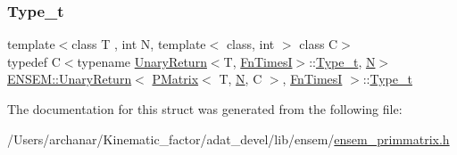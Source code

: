\mbox{\label{structENSEM_1_1UnaryReturn_3_01PMatrix_3_01T_00_01N_00_01C_01_4_00_01FnTimesI_01_4_aab89467172d831a392a305ca7f49772e}} 
\subsubsection{\texorpdfstring{Type\_t}{Type\_t}\hspace{0.1cm}{\footnotesize\ttfamily [2/2]}}
{\footnotesize\ttfamily template$<$class T , int N, template$<$ class, int $>$ class C$>$ \\
typedef C$<$typename \mbox{\hyperlink{structENSEM_1_1UnaryReturn}{Unary\+Return}}$<$T, \mbox{\hyperlink{structENSEM_1_1FnTimesI}{Fn\+TimesI}}$>$\+::\mbox{\hyperlink{structENSEM_1_1UnaryReturn_3_01PMatrix_3_01T_00_01N_00_01C_01_4_00_01FnTimesI_01_4_aab89467172d831a392a305ca7f49772e}{Type\+\_\+t}}, \mbox{\hyperlink{operator__name__util_8cc_a7722c8ecbb62d99aee7ce68b1752f337}{N}}$>$ \mbox{\hyperlink{structENSEM_1_1UnaryReturn}{E\+N\+S\+E\+M\+::\+Unary\+Return}}$<$ \mbox{\hyperlink{classENSEM_1_1PMatrix}{P\+Matrix}}$<$ T, \mbox{\hyperlink{operator__name__util_8cc_a7722c8ecbb62d99aee7ce68b1752f337}{N}}, C $>$, \mbox{\hyperlink{structENSEM_1_1FnTimesI}{Fn\+TimesI}} $>$\+::\mbox{\hyperlink{structENSEM_1_1UnaryReturn_3_01PMatrix_3_01T_00_01N_00_01C_01_4_00_01FnTimesI_01_4_aab89467172d831a392a305ca7f49772e}{Type\+\_\+t}}}



The documentation for this struct was generated from the following file\+:\begin{DoxyCompactItemize}
\item 
/\+Users/archanar/\+Kinematic\+\_\+factor/adat\+\_\+devel/lib/ensem/\mbox{\hyperlink{lib_2ensem_2ensem__primmatrix_8h}{ensem\+\_\+primmatrix.\+h}}\end{DoxyCompactItemize}
